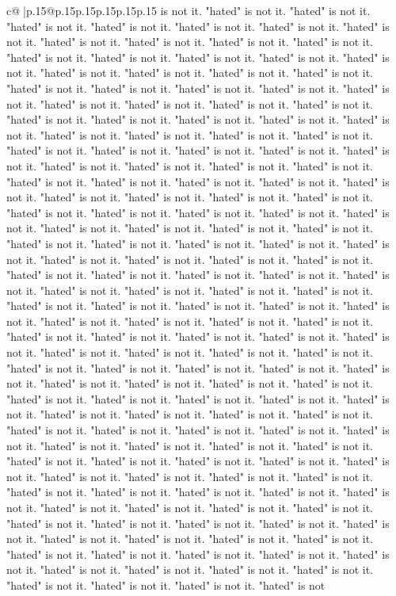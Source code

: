 \documentclass{article}
\begin{document}
{\begin{supertabular}{c@{$\;$}|p{.15\linewidth}@{}p{.15\linewidth}p{.15\linewidth}p{.15\linewidth}p{.15\linewidth}p{.15\linewidth}}
{{{is not it. "hated" is not it. "hated" is not it. "hated" is not it. "hated" is not it. "hated" is not it. "hated" is not it. "hated" is not it. "hated" is not it. "hated" is not it. "hated" is not it. "hated" is not it. "hated" is not it. "hated" is not it. "hated" is not it. "hated" is not it. "hated" is not it. "hated" is not it. "hated" is not it. "hated" is not it. "hated" is not it. "hated" is not it. "hated" is not it. "hated" is not it. "hated" is not it. "hated" is not it. "hated" is not it. "hated" is not it. "hated" is not it. "hated" is not it. "hated" is not it. "hated" is not it. "hated" is not it. "hated" is not it. "hated" is not it. "hated" is not it. "hated" is not it. "hated" is not it. "hated" is not it. "hated" is not it. "hated" is not it. "hated" is not it. "hated" is not it. "hated" is not it. "hated" is not it. "hated" is not it. "hated" is not it. "hated" is not it. "hated" is not it. "hated" is not it. "hated" is not it. "hated" is not it. "hated" is not it. "hated" is not it. "hated" is not it. "hated" is not it. "hated" is not it. "hated" is not it. "hated" is not it. "hated" is not it. "hated" is not it. "hated" is not it. "hated" is not it. "hated" is not it. "hated" is not it. "hated" is not it. "hated" is not it. "hated" is not it. "hated" is not it. "hated" is not it. "hated" is not it. "hated" is not it. "hated" is not it. "hated" is not it. "hated" is not it. "hated" is not it. "hated" is not it. "hated" is not it. "hated" is not it. "hated" is not it. "hated" is not it. "hated" is not it. "hated" is not it. "hated" is not it. "hated" is not it. "hated" is not it. "hated" is not it. "hated" is not it. "hated" is not it. "hated" is not it. "hated" is not it. "hated" is not it. "hated" is not it. "hated" is not it. "hated" is not it. "hated" is not it. "hated" is not it. "hated" is not it. "hated" is not it. "hated" is not it. "hated" is not it. "hated" is not it. "hated" is not it. "hated" is not it. "hated" is not it. "hated" is not it. "hated" is not it. "hated" is not it. "hated" is not it. "hated" is not it. "hated" is not it. "hated" is not it. "hated" is not it. "hated" is not it. "hated" is not it. "hated" is not it. "hated" is not it. "hated" is not it. "hated" is not it. "hated" is not it. "hated" is not it. "hated" is not it. "hated" is not it. "hated" is not it. "hated" is not it. "hated" is not it. "hated" is not it. "hated" is not it. "hated" is not it. "hated" is not it. "hated" is not it. "hated" is not it. "hated" is not it. "hated" is not it. "hated" is not it. "hated" is not it. "hated" is not it. "hated" is not it. "hated" is not it. "hated" is not it. "hated" is not it. "hated" is not it. "hated" is not it. "hated" is not it. "hated" is not it. "hated" is not it. "hated" is not it. "hated" is not it. "hated" is not it. "hated" is not it. "hated" is not it. "hated" is not it. "hated" is not it. "hated" is not it. "hated" is not it. "hated" is not it. "hated" is not it. "hated" is not it. "hated" is not it. "hated" is not it. "hated" is not it. "hated" is not it. "hated" is not it. "hated" is not it. "hated" is not it. "hated" is not it. "hated" is not it. "hated" is not it. "hated" is not }}}
\end{supertabular}}
\end{document}
